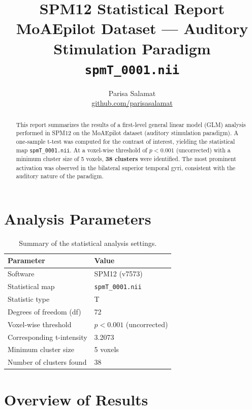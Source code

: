 \documentclass[11pt,a4paper]{article}
\title{\textbf{SPM12 Statistical Report}\\[0.3em]
\large MoAEpilot Dataset --- Auditory Stimulation Paradigm\\[0.5em]
\large \texttt{spmT\_0001.nii}}
\author{Parisa Salamat \\ \small \href{https://github.com/parisasalamat}{github.com/parisasalamat}}
\date{}
\begin{document}
\maketitle

\begin{abstract}
\noindent
This report summarizes the results of a first-level general linear model (GLM) analysis performed in SPM12 on the MoAEpilot dataset (auditory stimulation paradigm). A one-sample t-test was computed for the contrast of interest, yielding the statistical map \texttt{spmT\_0001.nii}. At a voxel-wise threshold of $p < 0.001$ (uncorrected) with a minimum cluster size of 5 voxels, \textbf{38 clusters} were identified. The most prominent activation was observed in the bilateral superior temporal gyri, consistent with the auditory nature of the paradigm.
\end{abstract}

\section{Analysis Parameters}

\begin{table}[h!]
\centering
\caption{Summary of the statistical analysis settings.}
\label{tab:params}
\begin{tabular}{@{}ll@{}}
\toprule
\textbf{Parameter} & \textbf{Value} \\
\midrule
Software & SPM12 (v7573) \\
Statistical map & \texttt{spmT\_0001.nii} \\
Statistic type & T \\
Degrees of freedom (df) & 72 \\
Voxel-wise threshold & $p < 0.001$ (uncorrected) \\
Corresponding t-intensity & 3.2073 \\
Minimum cluster size & 5 voxels \\
Number of clusters found & 38 \\
\bottomrule
\end{tabular}
\end{table}

\section{Overview of Results}
\end{document}
